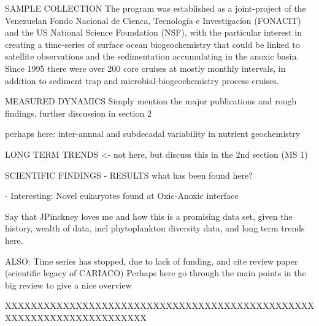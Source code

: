 SAMPLE COLLECTION
The program was established as a joint-project of the Venezuelan Fondo Nacional de Cienca, Tecnolog\'{i}a e Investigac\'{i}on (FONACIT) and the US National Science Foundation (NSF), with the particular interest in creating a time-series of surface ocean biogeochemistry that could be linked to satellite observations and the sedimentation accumulating in the anoxic basin. Since 1995 there were over 200 core cruises at mostly monthly intervals, in addition to sediment trap and microbial-biogeochemistry process cruises. 


MEASURED DYNAMICS
Simply mention the major publications and rough findings, further discussion in section 2

perhaps here:
inter-annual and subdecadal variability in nutrient geochemistry \citep{Scranton2014}


LONG TERM TRENDS <- not here, but discuss this in the 2nd section (MS 1)

SCIENTIFIC FINDINGS - RESULTS what has been found here?

- Interesting: Novel eukaryotes found at Oxic-Anoxic interface \citep{Stoeck2003}

Say that JPinckney loves me
and how this is a promising data set, given the history, wealth of data, incl phytoplankton diversity data, and long term trends here.

ALSO: Time series has stopped, due to lack of funding, and cite review paper (scientific legacy of CARIACO) \citep{Muller-Karger2019a}
Perhaps here go through the main points in the big review to give a nice overview



XXXXXXXXXXXXXXXXXXXXXXXXXXXXXXXXXXXXXXXXXXXXXXXXXXXXXXXXXXXXXXXXXXXXXX

